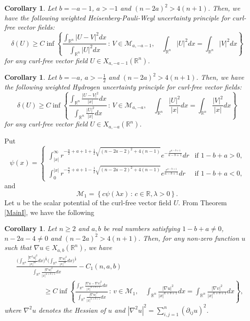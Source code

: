 \documentclass[a4paper,12pt]{article}
\theoremstyle{plain}
\newtheorem{corollary}[theorem]{Corollary}
\theoremstyle{definition}
\theoremstyle{remark}
\def\R{\mathbb R}%
\def\pa{\partial}%
\def\irn{\int_{\R^n}}
\numberwithin{equation}{section}
\begin{document}
\begin{corollary}
	Let $b = -a -1$, $a > -1$ and $(n-2a)^2 > 4(n+1)$. Then,  we have the following weighted Heisenberg-Pauli-Weyl uncertainty principle for curl-free vector fields:
\[
\delta(U) \geq C \inf\left\{\frac{\irn |U - V|^2 dx}{\irn |U|^2 dx}\, :\, V \in \mathcal M_{a,-a-1},\quad \irn |U|^2 dx = \irn |V|^2 dx\right\}
\]
for any curl-free vector field $U\in X_{a,-a-1}(\R^n)$.
\end{corollary} 
\begin{corollary}
	Let $b = -a$, $a  > -\frac12$ and $(n-2a)^2 > 4(n+1)$. Then,  we have the following weighted Hydrogen uncertainty principle for curl-free vector fields:
\[
\delta(U) \geq C \inf\left\{\frac{\irn \frac{|U - V|^2}{|x|} dx}{\irn \frac{|U|^2}{|x|} dx}\, :\, V \in \mathcal M_{a,-a},\quad \irn \frac{|U|^2}{|x|} dx = \irn \frac{|V|^2}{|x|} dx\right\}
\]
for any curl-free vector field $U\in X_{a,-a}(\R^n)$.

\end{corollary}
Put 
\begin{equation*}%
\psi(x) = 
\begin{cases}
\int_{|x|}^\infty r^{ -\frac n2 + a +1 +\frac12 \sqrt{(n-2a -2)^2 + 4(n-1)}} e^{-\frac{r^{a -b +1}}{a -b +1}} dr &\mbox{if $1-b+a >0$,}\\
\int_0^{|x|} r^{ -\frac n2 + a +1 -\frac12 \sqrt{(n-2a -2)^2 + 4(n-1)}} e^{\frac{r^{a -b +1}}{a -b +1}} dr &\mbox{if $1-b+a <0$,}
\end{cases}
\end{equation*}
and 
\[
\mathcal M_1 = \left\{c \psi(\lambda x)\, :\, c \in \R, \lambda >0 \right\}.
\]
Let $u$ be the scalar potential of the curl-free vector field $U$. From Theorem \ref{MainI}, we have the following 
\begin{corollary}
Let $n\geq 2$ and $a, b$ be  real numbers satisfying $1-b+a \not=0$, $n -2a -4 \not=0$ and  $(n-2a)^2 > 4(n+1)$. Then, for any non-zero function $u$ such that $\nabla u\in X_{a,b}(\R^n)$, we have 
\begin{align*}
&\frac{\Big(\irn \frac{|\nabla^2 u|^2}{|x|^{2a}} dx\Big)^{\frac12}\Big( \irn \frac{|\nabla u|^2}{|x|^{2b}} dx\Big)^{\frac12}}{\irn \frac{|\nabla u|^2}{|x|^{a+b+1}} dx} -C_1(n,a,b) \\
&\qquad\qquad \geq C \inf\left\{\frac{\irn \frac{|\nabla u - \nabla v|^2}{|x|^{a+b+1}} dx}{\irn \frac{|\nabla u|^2}{|x|^{a+b+1}} dx}\, :\, v \in \mathcal M_{1},\quad \irn \frac{|\nabla u|^2}{|x|^{a+b+1}} dx = \irn \frac{|\nabla v|^2}{|x|^{a+b+1}} dx\right\},
\end{align*}
where $\nabla^2 u$ denotes the Hessian of $u$ and $|\nabla^2 u|^2 = \sum_{i,j=1}^n (\pa_{ij} u)^2$.
\end{corollary}
\end{document}
